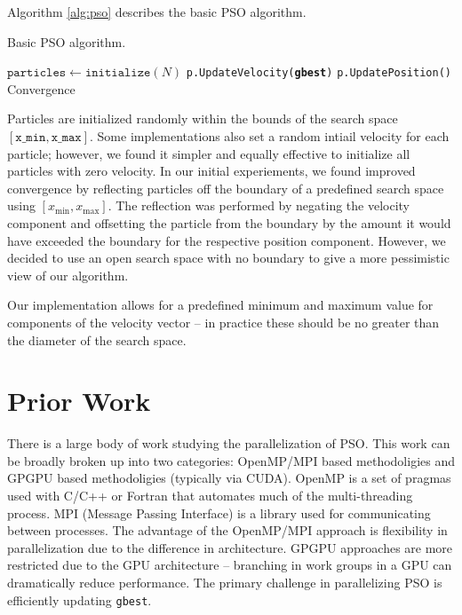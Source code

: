 Algorithm \ref{alg:pso} describes the basic PSO algorithm.

\begin{algorithm}
  \caption{Basic PSO algorithm.}\label{alg:pso}
  \begin{algorithmic}[1]
    \State $\texttt{particles} \gets \texttt{initialize}(N)$
    \Repeat
    \State \texttt{p.UpdateVelocity(\textbf{gbest})}
    \State \texttt{p.UpdatePosition()}
    \EndFor
    \Until Convergence
    \EndProcedure
  \end{algorithmic}
\end{algorithm}

Particles are initialized randomly within the bounds of the search space
$[\texttt{x\_min}, \texttt{x\_max}]$. Some implementations also set a random
intiail velocity for each particle; however, we found it simpler and equally
effective to initialize all particles with zero velocity. In our initial
experiements, we found improved convergence by reflecting particles off the
boundary of a predefined search space using $[x_{\min}, x_{\max}]$. The
reflection was performed by negating the velocity component and offsetting the
particle from the boundary by the amount it would have exceeded the boundary for
the respective position component.
However, we decided to use an open search space with no boundary to give a more
pessimistic view of our algorithm.

Our implementation allows for a predefined minimum and maximum value for
components of the velocity vector -- in practice these should be no greater than
the diameter of the search space.

\section{Prior Work}
There is a large body of work studying the parallelization of PSO. This work can
be broadly broken up into two categories: OpenMP/MPI based methodoligies and
GPGPU based methodoligies (typically via CUDA). OpenMP is a set of pragmas used
with C/C++ or Fortran that automates much of the multi-threading process. MPI
(Message Passing Interface) is a library used for communicating between processes.
The advantage of the OpenMP/MPI
approach is flexibility in parallelization due to the difference in
architecture. GPGPU approaches are more restricted due to the GPU architecture
-- branching in work groups in a GPU can dramatically reduce performance. The
primary challenge in parallelizing PSO is efficiently updating \texttt{gbest}.

